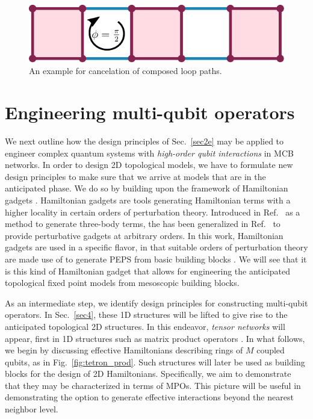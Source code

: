 \documentclass[twocolumn,floats,prx,showpacs]{revtex4-1}
\begin{document}
\begin{figure}
\includegraphics[width=0.72 \columnwidth]{fig/compose.pdf}
\caption{An example for cancelation of composed loop paths.}
\label{fig:compose}
\end{figure}



\section{Engineering multi-qubit operators}\label{sec3}

We next outline  how the  design principles of Sec.~\ref{sec2e} may be applied to engineer complex quantum systems with \emph{high-order qubit interactions} in MCB networks. 
In order to design 2D topological models, we have to formulate new
design principles to make sure that we arrive at models that are in the anticipated phase. We do so by building upon the 
framework of Hamiltonian gadgets 
\cite{Kempe-SIAM-2006,PhysRevA.77.062329,Brell2014PEPS,Bartlett06}. Hamiltonian gadgets
are tools generating Hamiltonian terms with a higher locality in certain orders of perturbation theory. Introduced
in Ref.\ \cite{Kempe-SIAM-2006} as a method to generate three-body terms, the has been generalized in Ref.\
\cite{PhysRevA.77.062329} to provide perturbative gadgets at arbitrary orders. In this work, Hamiltonian gadgets are used in a 
specific flavor, in that suitable orders of perturbation theory are made use of to generate PEPS from basic building blocks
\cite{Brell2014PEPS,Bartlett06}. We will see that it is this kind of Hamiltonian gadget that allows for engineering 
the anticipated topological fixed point models from mesoscopic building blocks.


As an intermediate step, we 
identify design principles for constructing multi-qubit operators. In Sec.\ \ref{sec4}, these 1D
structures will be lifted to give rise to the anticipated topological 2D structures. In this endeavor, \emph{tensor networks} \cite{Orus-AnnPhys-2014,AreaReview,VerstraeteBig,SchuchReview}
will appear, first in 1D structures such as matrix product operators 
\cite{Mixed,1367-2630-12-2-025012,raey,MPO_Representations,UndecidableMPO,Bultinck2017}.
In what follows,
we begin by discussing effective Hamiltonians describing  rings of $M$ coupled qubits,   as  in Fig.~\ref{fig:tetron_prod}. Such structures will later be used as building blocks for the design of 2D Hamiltonians. Specifically, we aim to demonstrate that they may be characterized in terms of MPOs. This picture will be useful in  demonstrating the option to generate effective interactions beyond the nearest neighbor level.  
\end{document}
